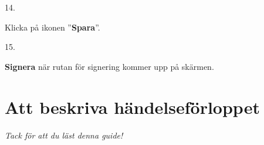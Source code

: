 \documentclass[paper=a5,DIV=15,headinclude,twoside=semi,openany,titlepage=firstiscover]{scrbook}
\begin{document}
\noindent\hrulefill

\vfill
\noindent
\begin{minipage}[t]{0.06\textwidth}
	14.
\end{minipage}%
\begin{minipage}[t]{.44\textwidth}
	Klicka på ikonen ”\textbf{Spara}”.
\end{minipage}%
\begin{minipage}[t]{.5\textwidth}
	\hfill{}
\end{minipage}
\vfill

\noindent\hrulefill

\vfill
\noindent
\begin{minipage}[t]{0.06\textwidth}
	15.
\end{minipage}%
\begin{minipage}[t]{.44\textwidth}
	\textbf{Signera} när rutan för signering kommer upp på skärmen.
\end{minipage}%
\begin{minipage}[t]{.5\textwidth}
	\hfill{}
\end{minipage}
\vfill

\noindent\hrulefill

\clearpage

\section*{Att beskriva händelseförloppet}

\clearpage

\begin{center}
\textit{Tack för att du läst denna guide!}
\end{center}
\end{document}
